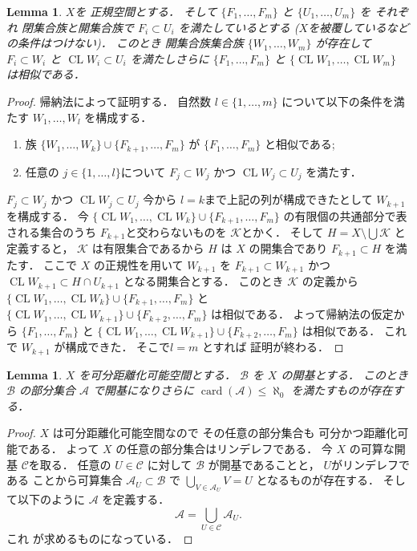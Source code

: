 \documentclass[leqno, a4paper, 12pt]{jsarticle}
\theoremstyle{plain}
\newtheorem{lem}[thm]{Lemma}
\theoremstyle{definition}
\theoremstyle{remark}
\DeclareMathOperator{\card}{\mathrm{card}}
\DeclareMathOperator{\cl}{\mathrm{CL}}
\numberwithin{equation}{section}
\begin{document}
\begin{lem}\label{lem:souji}
$X$を
正規空間とする．
そして
$\{F_{1}, \dots, F_{m}\}$
と
$\{U_{1}, \dots, U_{m}\}$
を
それぞれ
閉集合族と開集合族で
$F_{i}\subset U_{i}$
を満たしているとする
($X$を被覆しているなどの条件はつけない)．
このとき
開集合族集合族
$\{W_{1}, \dots, W_{m}\}$
が存在して
$F_{i}\subset W_{i}$
と
$\cl W_{i}\subset U_{i}$
を満たしさらに
$\{F_{1}, \dots, F_{m}\}$
と
$\{\cl W_{1}, \dots, \cl W_{m}\}$
は相似である．
\end{lem}
\begin{proof}
帰納法によって証明する．
自然数
$l\in \{1, \dots, m\}$
について以下の条件を満たす
$W_{1},  \dots, W_{l}$
を構成する．
\begin{enumerate}[label=\textup{(\arabic*)}]
\item
族
$\{W_{1}, \dots, W_{k}\}\cup \{F_{k+1}, \dots, F_{m}\}$
が
$\{F_{1}, \dots, F_{m}\}$
と相似である;
\item 
任意の
$j\in \{1, \dots, l\}$について
$F_{j}\subset W_{j}$
かつ
$\cl W_{j}\subset U_{j}$
を満たす．
\end{enumerate}
$F_{j}\subset W_{j}$
かつ
$\cl W_{j}\subset U_{j}$
今から
$l=k$まで上記の列が構成できたとして
$W_{k+1}$を構成する．
今
$\{\cl W_{1}, \dots, \cl W_{k}\}\cup \{F_{k+1}, \dots, F_{m}\}$
の有限個の共通部分で表される集合のうち
$F_{k+1}$と交わらないものを
$\mathcal{K}$とかく．
そして
$H=X \setminus \bigcup\mathcal{K}$
と定義すると，
$\mathcal{K}$
は有限集合であるから
$H$
は
$X$
の開集合であり
$F_{k+1}\subset H$
を満たす．
ここで
$X$
の正規性を用いて
$W_{k+1}$
を
$F_{k+1}\subset W_{k+1}$
かつ
$\cl W_{k+1}\subset H\cap U_{k+1}$
となる開集合とする．
このとき
$\mathcal{K}$
の定義から
$\{\cl W_{1}, \dots, \cl W_{k}\}\cup \{F_{k+1}, \dots, F_{m}\}$
と
$\{\cl W_{1}, \dots, \cl W_{k+1}\}\cup \{F_{k+2}, \dots, F_{m}\}$
は相似である．
よって帰納法の仮定から
$\{F_{1}, \dots, F_{m}\}$
と
$\{\cl W_{1}, \dots, \cl W_{k+1}\}\cup \{F_{k+2}, \dots, F_{m}\}$
は相似である．
これで
$W_{k+1}$
が構成できた．
そこで$l=m$
とすれば
証明が終わる．
\end{proof}


\begin{lem}\label{lem:toridashi}
$X$
を可分距離化可能空間とする．
$\mathcal{B}$
を
$X$
の開基とする．
このとき
$\mathcal{B}$
の部分集合
$\mathcal{A}$
で開基になりさらに
$\card(\mathcal{A})\le \aleph_{0}$
を満たすものが存在する．
\end{lem}
\begin{proof}
$X$
は可分距離化可能空間なので
その任意の部分集合も
可分かつ距離化可能である．
よって
$X$
の任意の部分集合はリンデレフである．
今
$X$
の可算な開基
$\mathcal{C}$を取る．
任意の
$U\in \mathcal{C}$
に対して
$\mathcal{B}$
が開基であることと，
$U$がリンデレフである
ことから可算集合
$\mathcal{A}_{U}\subset \mathcal{B}$
で
$\bigcup_{V\in  \mathcal{A}_{U}}V=U$
となるものが存在する．
そして以下のように
$\mathcal{A}$
を定義する．
\[
\mathcal{A}=\bigcup_{U\in \mathcal{C}}\mathcal{A}_{U}. 
\]
これ
が求めるものになっている．
\end{proof}
\end{document}

